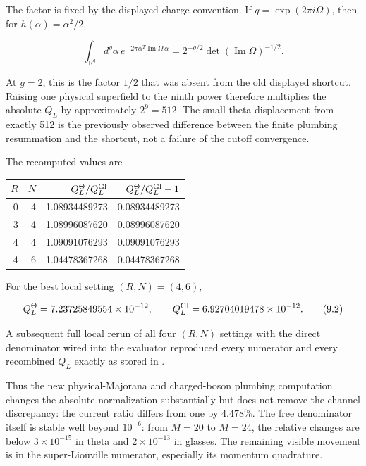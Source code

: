\documentclass[11pt]{article}
\begin{document}
The factor is fixed by the displayed charge convention.  If
\(q=\exp(2\pi i\Omega)\), then for \(h(\alpha)=\alpha^2/2\),

\[
 \int_{\mathbb R^g}d^g\alpha\,
 e^{-2\pi\alpha^T\operatorname{Im}\Omega\,\alpha}
 =2^{-g/2}\det(\operatorname{Im}\Omega)^{-1/2}.
\tag{9.1}
\]

At \(g=2\), this is the factor \(1/2\) that was absent from the old displayed
shortcut.  Raising one physical superfield to the ninth power therefore
multiplies the absolute \(Q_L\) by approximately \(2^9=512\).  The small
theta displacement from exactly 512 is the previously observed difference
between the finite plumbing resummation and the shortcut, not a failure of
the cutoff convergence.

The recomputed values are

\begin{center}
\small
\begin{tabular}{rrrr}
\toprule
\(R\) & \(N\) & \(Q_L^\Theta/Q_L^{\rm Gl}\) &
\(Q_L^\Theta/Q_L^{\rm Gl}-1\) \\
\midrule
0 & 4 & 1.08934489273 & 0.08934489273 \\
3 & 4 & 1.08996087620 & 0.08996087620 \\
4 & 4 & 1.09091076293 & 0.09091076293 \\
4 & 6 & 1.04478367268 & 0.04478367268 \\
\bottomrule
\end{tabular}
\end{center}

For the best local setting \((R,N)=(4,6)\),

\[
 Q_L^\Theta=7.23725849554\times10^{-12},\qquad
 Q_L^{\rm Gl}=6.92704019478\times10^{-12}.
\tag{9.2}
\]

A subsequent full local rerun of all four \((R,N)\) settings with the direct
denominator wired into the evaluator reproduced every numerator and every
recombined \(Q_L\) exactly as stored in
\texttt{}.

Thus the new physical-Majorana and charged-boson plumbing computation
changes the absolute normalization substantially but does not remove the
channel discrepancy: the current ratio differs from one by \(4.478\%\).
The free denominator itself is stable well beyond \(10^{-6}\): from
\(M=20\) to \(M=24\), the relative changes are below \(3\times10^{-15}\) in
theta and \(2\times10^{-13}\) in glasses.  The remaining visible movement is in
the super-Liouville numerator, especially its momentum quadrature.
\end{document}
